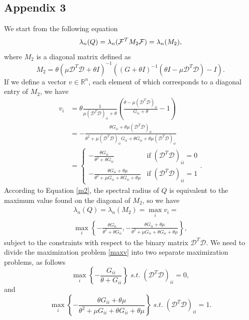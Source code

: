 \documentclass[letterpaper]{article} %
\begin{document}
 \subsection*{Appendix 3}
 We start from the following equation
 \begin{equation} \label{m2}
     \lambda_n(Q)  = \lambda_n({\cal F^T} M_2 {\cal F}) = \lambda_n(M_2),
 \end{equation}
where $M_2$ is a diagonal matrix defined as
 \begin{equation*}\label{iterdeblurring}
	 M_2=\theta(\mu \mathcal{D}^T \mathcal{D}+\theta I)^{-1} ( ( G +\theta I)^{-1} (\theta I -  \mu \mathcal{D}^T \mathcal{D} ) - I).
\end{equation*}
If we define a vector $v \in \mathbb{R}^n$, each element of which corresponds to a diagonal entry of $M_2$, we have
\begin{equation*}\label{iterdeblurring}
\begin{split}
	 v_i&=\theta \frac{1}{\mu(\mathcal{D}^T \mathcal{D})_{ii}+\theta}  \left(\frac{\theta -  \mu (\mathcal{D}^T \mathcal{D})_{ii} }{ G_{ii} +\theta }   - 1\right)\\
         &=-\frac{\theta G_{ii}+\theta\mu (\mathcal{D}^T \mathcal{D})_{ii}}{\theta^2+\mu (\mathcal{D}^T \mathcal{D})_{ii} G_{ii}+\theta G_{ii}+\theta\mu (\mathcal{D}^T \mathcal{D})_{ii}}\\
         &=  \begin{cases} 
            -\frac{\theta G_{ii}}{\theta^2+\theta G_{ii}}& \text{if}\;(\mathcal{D}^T \mathcal{D})_{ii}= 0\\
		-\frac{\theta G_{ii}+\theta\mu }{\theta^2+\mu G_{ii}+\theta G_{ii}+\theta\mu } & \text{if}\;(\mathcal{D}^T \mathcal{D})_{ii}= 1
	\end{cases}.
 \end{split}
\end{equation*}
According to Equation \eqref{m2}, the spectral radius of $Q$ is equivalent to the maximum value found on the diagonal of $M_2$, so we have
\begin{multline} \label{maxv}
    \lambda_n(Q)   = \lambda_n(M_2) = \max_i v_i   = \\ 
  \max_i \left \{ -\frac{\theta G_{ii}}{\theta^2+\theta G_{ii}},  -\frac{\theta G_{ii}+\theta\mu }{\theta^2+\mu G_{ii}+\theta G_{ii}+\theta\mu } \right\},
\end{multline}
subject to the constraints with respect to the binary matrix $\mathcal{D}^T \mathcal{D}$. We need to divide the maximization problem \eqref{maxv} into two separate maximization problems, as follows
\begin{equation} \label{max1}
\max_i \left \{ -\frac{ G_{ii}}{\theta+G_{ii}}\right\}  \; s.t. \; (\mathcal{D}^T\mathcal{D})_{ii} = 0, 
\end{equation}
and
\begin{equation} \label{max2}
\max_i \left \{ -\frac{\theta G_{ii}+\theta\mu }{\theta^2+\mu G_{ii}+\theta G_{ii}+\theta\mu }  \right\}  \; s.t. \; (\mathcal{D}^T\mathcal{D})_{ii} = 1.
\end{equation}
\end{document}
